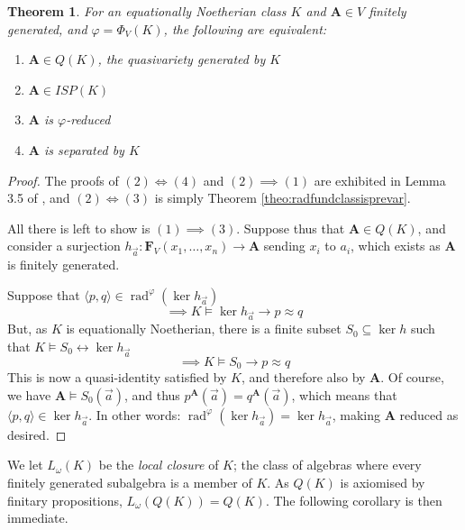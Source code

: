 \documentclass{article}
\theoremstyle{plain}
\newtheorem{theorem}{Theorem}[section]
\theoremstyle{definition}
\newcommand{\rad}{\operatorname{rad}}
\begin{document}
\begin{theorem} \label{theo:fingenISPisQ}
    For an equationally Noetherian class $K$ and $\mathbf{A} \in V$ finitely generated, and $\varphi = \Phi_V(K)$, the following are equivalent:
    \begin{enumerate}
        \item $\mathbf{A} \in Q(K)$, the quasivariety generated by $K$
        \item $\mathbf{A} \in ISP(K)$
        \item $\mathbf{A}$ is $\varphi$-reduced
        \item $\mathbf{A}$ is separated by $K$
    \end{enumerate}
\end{theorem}
\begin{proof}
    The proofs of $(2) \iff (4)$ and $(2) \implies (1)$ are exhibited in Lemma 3.5 of \cite{Daniyarova2008UnificationTI}, and $(2)\iff (3)$ is simply Theorem \ref{theo:radfundclassisprevar}.\par
    All there is left to show is $(1) \implies (3)$.
    Suppose thus that $\mathbf{A} \in Q(K)$, and consider a surjection $h_{\vec{a}} \colon \mathbf{F}_V(x_1, \dots, x_n) \rightarrow \mathbf{A}$ sending $x_i$ to $a_i$, which exists as $\mathbf{A}$ is finitely generated.\par
    Suppose that $\langle p, q\rangle \in \rad^\varphi(\ker h_{\vec{a}})$
    $$\implies K \models \ker h_{\vec{a}} \rightarrow p\approx q$$
    But, as $K$ is equationally Noetherian, there is a finite subset $S_0 \subseteq \ker h$ such that $K \models S_0 \leftrightarrow \ker h_{\vec{a}}$
    $$\implies K \models S_0 \rightarrow p\approx q$$
    This is now a quasi-identity satisfied by $K$, and therefore also by $\mathbf{A}$.
    Of course, we have $\mathbf{A} \models S_0(\vec{a})$, and thus $p^\mathbf{A}(\vec{a}) = q^\mathbf{A}(\vec{a})$, which means that $\langle p, q \rangle \in \ker h_{\vec{a}}$.
    In other words: $\rad^\varphi(\ker h_{\vec{a}}) = \ker h_{\vec{a}}$, making $\mathbf{A}$ reduced as desired.
\end{proof}

We let $L_\omega(K)$ be the \textit{local closure} of $K$; the class of algebras where every finitely generated subalgebra is a member of $K$.
As $Q(K)$ is axiomised by finitary propositions, $L_\omega(Q(K)) = Q(K)$.
The following corollary is then immediate.
\end{document}

